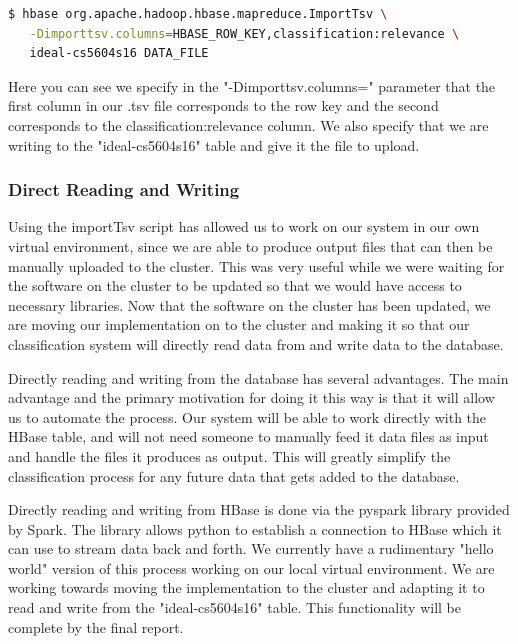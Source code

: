 \begin{lstlisting}[language=bash]
 $ hbase org.apache.hadoop.hbase.mapreduce.ImportTsv \
   -Dimporttsv.columns=HBASE_ROW_KEY,classification:relevance \
   ideal-cs5604s16 DATA_FILE
\end{lstlisting}

Here you can see we specify in the "-Dimporttsv.columns=" parameter that the first column in our .tsv file corresponds to the row key and the second corresponds to the classification:relevance column. We also specify that we are writing to the "ideal-cs5604s16" table and give it the file to upload.

\subsubsection{Direct Reading and Writing}

Using the importTsv script has allowed us to work on our system in our own virtual environment, since we are able to produce output files that can then be manually uploaded to the cluster. This was very useful while we were waiting for the software on the cluster to be updated so that we would have access to necessary libraries. Now that the software on the cluster has been updated, we are moving our implementation on to the cluster and making it so that our classification system will directly read data from and write data to the database.

Directly reading and writing from the database has several advantages. The main advantage and the primary motivation for doing it this way is that it will allow us to automate the process. Our system will be able to work directly with the HBase table, and will not need someone to manually feed it data files as input and handle the files it produces as output. This will greatly simplify the classification process for any future data that gets added to the database.

Directly reading and writing from HBase is done via the pyspark library provided by Spark. The library allows python to establish a connection to HBase which it can use to stream data back and forth. We currently have a rudimentary "hello world" version of this process working on our local virtual environment. We are working towards moving the implementation to the cluster and adapting it to read and write from the "ideal-cs5604s16" table. This functionality will be complete by the final report.



